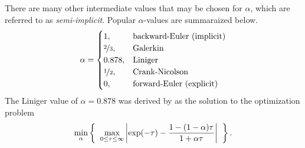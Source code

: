 There are many other intermediate values that may be chosen for $\alpha$, which are referred to as \emph{semi-implicit}.  Popular $\alpha$-values are summaraized below.
\begin{align*}
    \alpha = 
    \begin{cases}
      1,                   & \text{backward-Euler (implicit)}\\
      \nicefrac{2}{3},     & \text{Galerkin}\\
      0.878,               & \text{Liniger}\\
      \nicefrac{1}{2},     & \text{Crank-Nicolson}\\
      0,                   & \text{forward-Euler (explicit)}
    \end{cases}
\end{align*}
The Liniger value of $\alpha = 0.878$ was derived by \citet{liniger_1968} as the solution to the optimization problem
\begin{align*}
  \min_{\alpha} \left\{ \hspace{2mm} \max_{0 \leq \tau \leq \infty} \left| \exp(-\tau) - \frac{1 - (1-\alpha)\tau}{1 + \alpha \tau} \right| \hspace{2mm} \right\}.
\end{align*}
